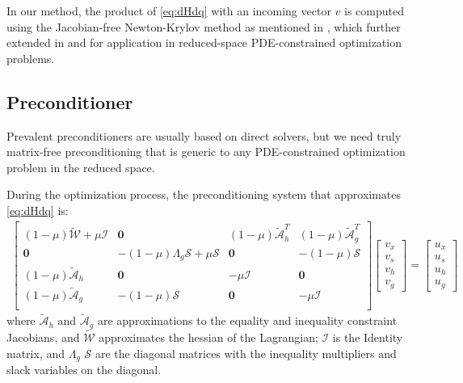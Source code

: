 \documentclass{article}
\theoremstyle{definition}
\begin{document}
In our method, the product of \eqref{eq:dHdq} with an incoming vector $v$ is computed using the Jacobian-free Newton-Krylov method as mentioned in \cite{Knoll:2004:JNM:973444.973445}, which further extended in \cite{hicken:inexact2014} and \cite{dener:idf2017} for application in reduced-space PDE-constrained optimization problems. 

\subsection{Preconditioner}
Prevalent preconditioners are usually based on direct solvers, but we need truly matrix-free preconditioning that is generic to any PDE-constrained optimization problem in the reduced space. 

During the optimization process, the preconditioning system that approximates \eqref{eq:dHdq} is:
\begin{equation}\label{eq:pcwithmu}
\begin{aligned}
\begin{bmatrix}
(1-\mu) \tilde{\mathcal{W}}  + \mu \mathcal{I} & \boldsymbol{0} & (1-\mu)\tilde{\mathcal{A}}_{h}^T  & (1-\mu)\tilde{\mathcal{A}}_{g}^T   \\
\boldsymbol{0}     &  -(1-\mu) \Lambda_g \mathcal{S} + \mu  \mathcal{S}   &  \boldsymbol{0} & -(1-\mu)\mathcal{S}  \\
(1-\mu)\tilde{\mathcal{A}}_{h}  &  \boldsymbol{0}  &  -\mu \mathcal{I} & \boldsymbol{0}  \\
(1-\mu)\tilde{\mathcal{A}}_{g}  & -(1-\mu) \mathcal{S}   &  \boldsymbol{0}    &   -\mu \mathcal{I} \\
\end{bmatrix}
\begin{bmatrix} v_x \\ v_s \\ v_h \\ v_g \end{bmatrix}=\begin{bmatrix} u_x \\ u_s \\ u_h \\ u_g \end{bmatrix}
\end{aligned}
\end{equation}
where $\tilde{\mathcal{A}}_{h}$ and $\tilde{\mathcal{A}}_{g}$ are approximations to the equality and inequality constraint Jacobians, and $\tilde{\mathcal{W}}$ approximates the hessian of the Lagrangian; $\mathcal{I}$ is the Identity matrix, and $\Lambda_g$  $\mathcal{S}$ are the diagonal matrices with the inequality multipliers and slack variables on the diagonal. 
\end{document}
